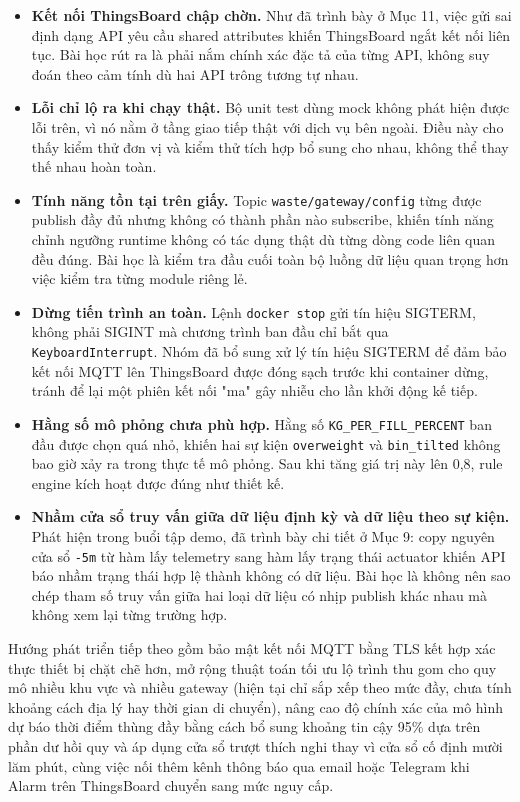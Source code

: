 \documentclass[12pt,a4paper]{article}
\begin{document}
\begin{itemize}
    \item \textbf{Kết nối ThingsBoard chập chờn.} Như đã trình bày ở Mục 11, việc gửi sai định dạng API yêu cầu shared attributes khiến ThingsBoard ngắt kết nối liên tục. Bài học rút ra là phải nắm chính xác đặc tả của từng API, không suy đoán theo cảm tính dù hai API trông tương tự nhau.
    \item \textbf{Lỗi chỉ lộ ra khi chạy thật.} Bộ unit test dùng mock không phát hiện được lỗi trên, vì nó nằm ở tầng giao tiếp thật với dịch vụ bên ngoài. Điều này cho thấy kiểm thử đơn vị và kiểm thử tích hợp bổ sung cho nhau, không thể thay thế nhau hoàn toàn.
    \item \textbf{Tính năng tồn tại trên giấy.} Topic \texttt{waste/gateway/config} từng được publish đầy đủ nhưng không có thành phần nào subscribe, khiến tính năng chỉnh ngưỡng runtime không có tác dụng thật dù từng dòng code liên quan đều đúng. Bài học là kiểm tra đầu cuối toàn bộ luồng dữ liệu quan trọng hơn việc kiểm tra từng module riêng lẻ.
    \item \textbf{Dừng tiến trình an toàn.} Lệnh \texttt{docker stop} gửi tín hiệu SIGTERM, không phải SIGINT mà chương trình ban đầu chỉ bắt qua \texttt{KeyboardInterrupt}. Nhóm đã bổ sung xử lý tín hiệu SIGTERM để đảm bảo kết nối MQTT lên ThingsBoard được đóng sạch trước khi container dừng, tránh để lại một phiên kết nối "ma" gây nhiễu cho lần khởi động kế tiếp.
    \item \textbf{Hằng số mô phỏng chưa phù hợp.} Hằng số \texttt{KG\_PER\_FILL\_PERCENT} ban đầu được chọn quá nhỏ, khiến hai sự kiện \texttt{overweight} và \texttt{bin\_tilted} không bao giờ xảy ra trong thực tế mô phỏng. Sau khi tăng giá trị này lên 0,8, rule engine kích hoạt được đúng như thiết kế.
    \item \textbf{Nhầm cửa sổ truy vấn giữa dữ liệu định kỳ và dữ liệu theo sự kiện.} Phát hiện trong buổi tập demo, đã trình bày chi tiết ở Mục 9: copy nguyên cửa sổ \texttt{-5m} từ hàm lấy telemetry sang hàm lấy trạng thái actuator khiến API báo nhầm trạng thái hợp lệ thành không có dữ liệu. Bài học là không nên sao chép tham số truy vấn giữa hai loại dữ liệu có nhịp publish khác nhau mà không xem lại từng trường hợp.
\end{itemize}

Hướng phát triển tiếp theo gồm bảo mật kết nối MQTT bằng TLS kết hợp xác thực thiết bị chặt chẽ hơn, mở rộng thuật toán tối ưu lộ trình thu gom cho quy mô nhiều khu vực và nhiều gateway (hiện tại chỉ sắp xếp theo mức đầy, chưa tính khoảng cách địa lý hay thời gian di chuyển), nâng cao độ chính xác của mô hình dự báo thời điểm thùng đầy bằng cách bổ sung khoảng tin cậy 95\% dựa trên phần dư hồi quy và áp dụng cửa sổ trượt thích nghi thay vì cửa sổ cố định mười lăm phút, cùng việc nối thêm kênh thông báo qua email hoặc Telegram khi Alarm trên ThingsBoard chuyển sang mức nguy cấp.
\end{document}
